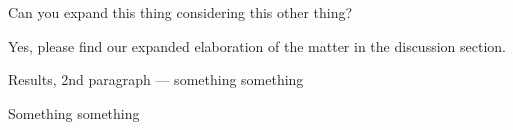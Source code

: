 \reviewersection

\begin{point}
	Can you expand this thing considering this other thing?
\end{point}
\begin{reply}
	Yes, please find our expanded elaboration of the matter in the discussion section.
\end{reply}

\begin{point}
	Results, 2nd paragraph --- something something 
\end{point}
\begin{reply}
	Something something
\end{reply}
